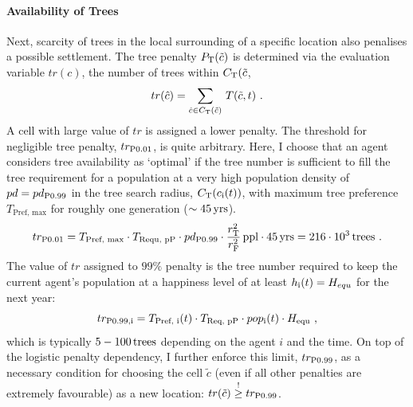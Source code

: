 \paragraph{Availability of Trees} %
Next, scarcity of trees in the local surrounding of a specific location also penalises a possible settlement.
The tree penalty $P_{\rm T}(\tilde{c})$ is determined via the evaluation variable $tr(c)$, the number of trees within $C_{\rm T}(\tilde{c}$,
\begin{equation}
	tr(\hat{c}) = \sum_{\hat{c} \in C_{\rm T}(\tilde{c})}\, T(\tilde{c},t) \ .
\end{equation}
A cell with large value of $tr$ is assigned a lower penalty.
The threshold for negligible tree penalty, $tr_{\rm P0.01}$, is quite arbitrary.
Here, I choose that an agent considers tree availability as `optimal' if the tree number is sufficient to fill the tree requirement for a population at a very high population density of $pd = pd_{\rm P0.99}$ in the tree search radius, $C_{\rm T}(c_{\rm i}(t))$, with maximum tree preference $T_\text{Pref, max}$  for roughly one generation ($\sim 45\, {\rm yrs}$).
\begin{equation}
tr_{\rm P0.01} = T_\text{Pref, max} \cdot T_\text{Requ, pP} \cdot pd_{\rm P0.99} \cdot \frac{r_{\rm T}^2}{r_{\rm F}^{2}} \, {\rm ppl} \cdot 45\, {\rm yrs} = 
216\cdot 10^3 \, {\rm trees} \ .
\end{equation} 
The value of $tr$ assigned to $99\%$ penalty is the tree number required to keep the current agent's population at a happiness level of at least $h_{\rm i}(t) = H_{equ}$ for the next year:
\begin{equation}%
tr_{\rm P0.99, i}= T_\text{Pref, i}(t) \cdot T_\text{Req, pP} \cdot pop_{\rm i}(t) \cdot H_\text{equ} \ ,
\end{equation}
which is typically $5-100\, {\rm trees}$ depending on the agent $i$ and the time.
On top of the logistic penalty dependency, I further enforce this limit, $tr_{\rm P0.99}$, as a necessary condition for choosing the cell $\tilde{c}$ (even if all other penalties are extremely favourable) as a new location: $tr(\tilde{c}) \stackrel{!}{\geq} tr_{\rm P0.99}$. 
